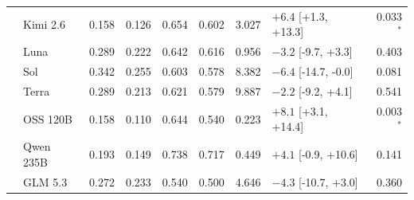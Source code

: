 \begin{longtable}{llrrrrrlr}
 & Kimi 2.6 & 0.158 & 0.126 & 0.654 & 0.602 & 3.027 & $+6.4$ [+1.3, +13.3] & 0.033$^{*}$ \\
 & Luna & 0.289 & 0.222 & 0.642 & 0.616 & 0.956 & $-3.2$ [-9.7, +3.3] & 0.403 \\
 & Sol & 0.342 & 0.255 & 0.603 & 0.578 & 8.382 & $-6.4$ [-14.7, -0.0] & 0.081 \\
 & Terra & 0.289 & 0.213 & 0.621 & 0.579 & 9.887 & $-2.2$ [-9.2, +4.1] & 0.541 \\
 & OSS 120B & 0.158 & 0.110 & 0.644 & 0.540 & 0.223 & $+8.1$ [+3.1, +14.4] & 0.003$^{*}$ \\
 & Qwen 235B & 0.193 & 0.149 & 0.738 & 0.717 & 0.449 & $+4.1$ [-0.9, +10.6] & 0.141 \\
 & GLM 5.3 & 0.272 & 0.233 & 0.540 & 0.500 & 4.646 & $-4.3$ [-10.7, +3.0] & 0.360 \\
\end{longtable}
